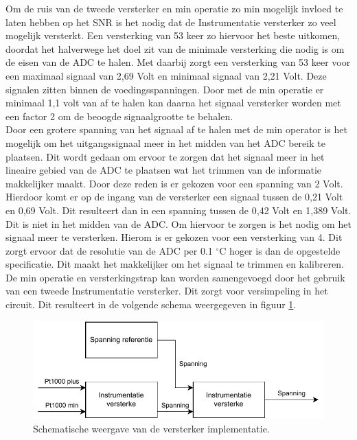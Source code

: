 Om de ruis van de tweede versterker en min operatie zo min mogelijk invloed te laten hebben op het SNR is het nodig dat de Instrumentatie versterker zo veel mogelijk versterkt. Een versterking van 53 keer zo hiervoor het beste uitkomen, doordat het halverwege het doel zit van de minimale versterking die nodig is om de eisen van de ADC te halen. Met daarbij zorgt een versterking van 53 keer voor een maximaal signaal van 2,69 Volt en minimaal signaal van 2,21 Volt. Deze signalen zitten binnen de voedingsspanningen. Door met de min operatie er minimaal 1,1 volt van af te halen kan daarna het signaal versterker worden met een factor 2 om de beoogde signaalgrootte te behalen.
\\
\newline
Door een grotere spanning van het signaal af te halen met de min operator is het mogelijk om het uitgangssignaal meer in het midden van het ADC bereik te plaatsen. Dit wordt gedaan om ervoor te zorgen dat het signaal meer in het lineaire gebied van de ADC te plaatsen wat het trimmen van de informatie makkelijker maakt. Door deze reden is er gekozen voor een spanning van 2 Volt. Hierdoor komt er op de ingang van de versterker een signaal tussen de 0,21 Volt en 0,69 Volt. Dit resulteert dan in een spanning tussen de 0,42 Volt en 1,389 Volt. Dit is niet in het midden van de ADC. Om hiervoor te zorgen is het nodig om het signaal meer te versterken. Hierom is er gekozen voor een versterking van 4. Dit zorgt ervoor dat de resolutie van de ADC per 0.1 $^\circ\text{C}$ hoger is dan de opgestelde specificatie. Dit maakt het makkelijker om het signaal te trimmen en kalibreren.
\\
\newline
De min operatie en versterkingstrap kan worden samengevoegd door het gebruik van een tweede Instrumentatie versterker. Dit zorgt voor versimpeling in het circuit. Dit resulteert in de volgende schema weergegeven in figuur \ref{fig:schema_versterkers_component_2}.

\begin{figure}[H]
    \centering
    \includegraphics[width=0.8\linewidth]{pictures/schema_instrumentatie_versterker_1.drawio.pdf}
    \caption{Schematische weergave van de versterker implementatie.}
    \label{fig:schema_versterkers_component_2}
\end{figure}

